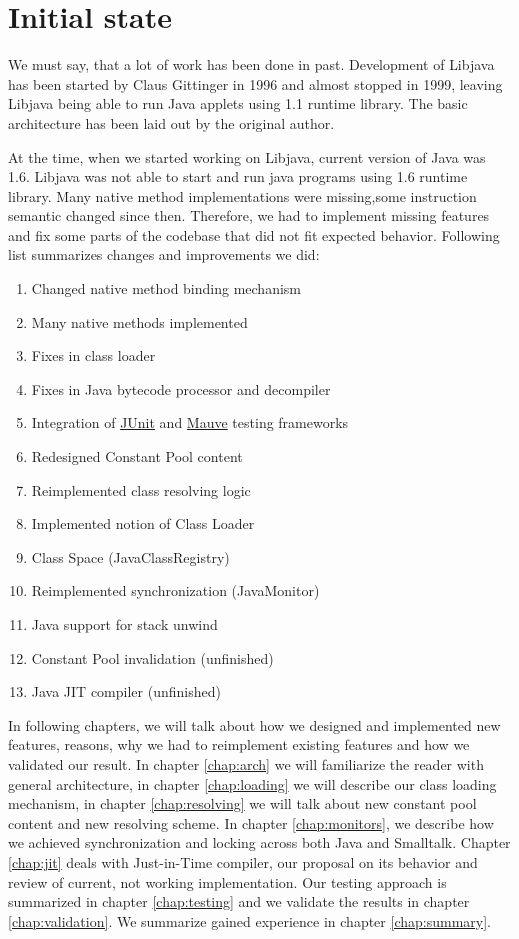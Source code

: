 \documentclass[11pt,twoside,a4paper]{book}
\newcommand{\libjava}{{Libjava}}
\begin{document}
\section{Initial state}
We must say, that a lot of work has been done in past. 
Development of \libjava{} has been started by Claus Gittinger in 1996 and almost stopped in 1999, leaving \libjava{} being able to run Java applets using 1.1 runtime library. 
The basic architecture has been laid out by the original author. 

At the time, when we started working on \libjava{}, current version of Java was 1.6. 
\libjava{} was not able to start and run java programs using 1.6 runtime library. Many native method implementations were missing,some instruction semantic changed since then.  
Therefore, we had to implement missing features and fix some parts of the codebase that did not fit expected behavior. 
Following list summarizes changes and improvements we did:

\begin{enumerate}
	\item Changed native method binding mechanism
	\item Many native methods implemented
	\item Fixes in class loader
	\item Fixes in Java bytecode processor and decompiler
	\item Integration of \href{http://www.junit.org/}{JUnit} and \href{http://sourceware.org/mauve/}{Mauve} testing frameworks
	\item Redesigned Constant Pool content
	\item Reimplemented class resolving logic
	\item Implemented notion of Class Loader
	\item Class Space (JavaClassRegistry)
	\item Reimplemented synchronization (JavaMonitor) 
	\item Java support for stack unwind
	\item Constant Pool invalidation (unfinished)
	\item Java JIT compiler (unfinished)
\end{enumerate}

In following chapters, we will talk about how we designed and implemented new features, reasons, why we had to reimplement existing features and how we validated our result. 
In chapter \ref{chap:arch} we will familiarize the reader with general architecture, in chapter \ref{chap:loading} we will describe our class loading mechanism, in chapter \ref{chap:resolving} we will talk about new constant pool content and new resolving scheme. 
In chapter \ref{chap:monitors}, we describe how we achieved synchronization and locking across both Java and Smalltalk. 
Chapter \ref{chap:jit} deals with Just-in-Time compiler, our proposal on its behavior and review of current, not working implementation. 
Our testing approach is summarized in chapter \ref{chap:testing} and we validate the results in chapter \ref{chap:validation}. We summarize gained experience in chapter \ref{chap:summary}.
\end{document}
